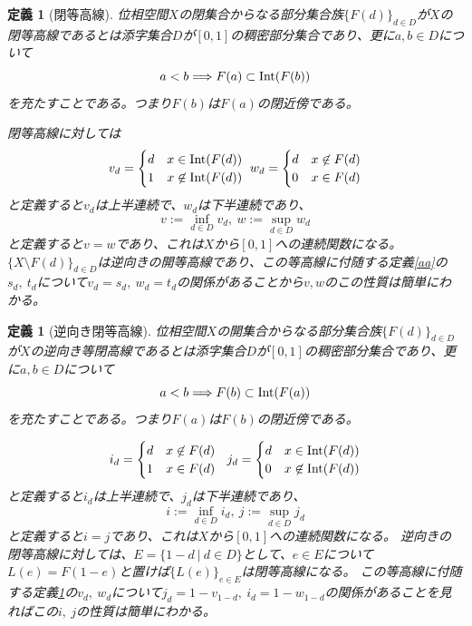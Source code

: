 \documentclass[leqno]{jsarticle}
\newtheorem{df}[thm]{定義}
\newcommand{\To}{\Longrightarrow}
\newcommand{\nai}{\text{{\rm Int}} }
\begin{document}
\begin{df}[閉等高線]\label{bb}
位相空間$X$の閉集合からなる部分集合族$\{F(d)\}_{d\in D}$が$X$の閉等高線であるとは添字集合$D$が$[0,1]$の稠密部分集合であり、更に$a,b\in D$について
\[
a<b\To F(a)\subset \nai(F(b))
\]
を充たすことである。つまり$F(b)$は$F(a)$の閉近傍である。\par
閉等高線に対しては
\[
v_d=\begin{cases}
 d & \text{$x\in \nai(F(d))$} \\
 1 & \text{$x\not\in \nai(F(d))$}
\end{cases}\ 
w_d=\begin{cases}
 d & \text{$x\not\in F(d)$} \\
 0 & \text{$x\in F(d)$}
\end{cases}
\]
と定義すると$v_d$は上半連続で、$w_d$は下半連続であり、
\[
v:=\inf_{d\in D}v_d,\ 
w:=\sup_{d\in D}w_d
\]
と定義すると$v=w$であり、これは$X$から$[0,1]$への連続関数になる。
$\{X\setminus F(d)\}_{d\in D}$は逆向きの開等高線であり、この等高線に付随する定義\ref{aa}の$s_d,\ t_d$について$v_d=s_d,\ w_d=t_d$の関係があることから$v,w$のこの性質は簡単にわかる。
\end{df}



\begin{df}[逆向き閉等高線]
位相空間$X$の開集合からなる部分集合族$\{F(d)\}_{d\in D}$が$X$の逆向き等閉高線であるとは添字集合$D$が$[0,1]$の稠密部分集合であり、更に$a,b\in D$について
\[
a<b\To F(b)\subset \nai(F(a))
\]
を充たすことである。つまり$F(a)$は$F(b)$の閉近傍である。\par
\[
i_d=\begin{cases}
 d & \text{$x\not\in F(d)$} \\
 1 & \text{$x\in F(d)$}
\end{cases}\ \ 
j_d=\begin{cases}
 d & \text{$x\in \nai(F(d))$} \\
 0 & \text{$x\not\in \nai(F(d))$}
\end{cases}
\]
と定義すると$i_d$は上半連続で、$j_d$は下半連続であり、
\[
i:=\inf_{d\in D}i_d,\ 
j:=\sup_{d\in D}j_d
\]
と定義すると$i=j$であり、これは$X$から$[0,1]$への連続関数になる。
逆向きの閉等高線に対しては、$E=\{1-d\ |\ d\in D\}$として、$e\in E$について$L(e)=F(1-e)$と置けば$\{L(e)\}_{e\in E}$は閉等高線になる。
この等高線に付随する定義\ref{bb}の$v_d,\ w_d$について$j_d=1-v_{1-d},\ i_d=1-w_{1-d}$の関係があることを見ればこの$i,\ j$の性質は簡単にわかる。


\end{df}
\end{document}

